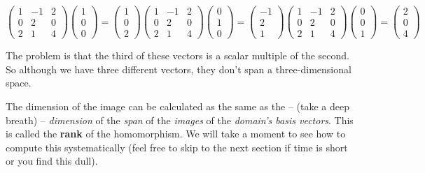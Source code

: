 \documentclass[oneside,english]{amsbook}
\numberwithin{section}{chapter}
\theoremstyle{plain}
\theoremstyle{definition}
\begin{document}
\[{\begin{pmatrix}
		1 & - 1 & 2 \\
		0 & 2 & 0 \\
		2 & 1 & 4
	\end{pmatrix}\begin{pmatrix}
		1 \\
		0 \\
		0
	\end{pmatrix} = \begin{pmatrix}
		1 \\
		0 \\
		2
	\end{pmatrix}
}{\begin{pmatrix}
		1 & - 1 & 2 \\
		0 & 2 & 0 \\
		2 & 1 & 4
	\end{pmatrix}\begin{pmatrix}
		0 \\
		1 \\
		0
	\end{pmatrix} = \begin{pmatrix}
		- 1 \\
		2 \\
		1
	\end{pmatrix}
}{\begin{pmatrix}
		1 & - 1 & 2 \\
		0 & 2 & 0 \\
		2 & 1 & 4
	\end{pmatrix}\begin{pmatrix}
		0 \\
		0 \\
		1
	\end{pmatrix} = \begin{pmatrix}
		2 \\
		0 \\
		4
\end{pmatrix}}\]

The problem is that the third of these vectors is a scalar multiple of
the second. So although we have three different vectors, they don't span
a three-dimensional space.

The dimension of the image can be calculated as the same as the -- (take
a deep breath) -- \emph{dimension} of the \emph{span} of the
\emph{images} of the \emph{domain's basis vectors}. This is called the
\textbf{rank} of the homomorphism. We will take a moment to see how to
compute this systematically (feel free to skip to the next section if
time is short or you find this dull).
\end{document}

